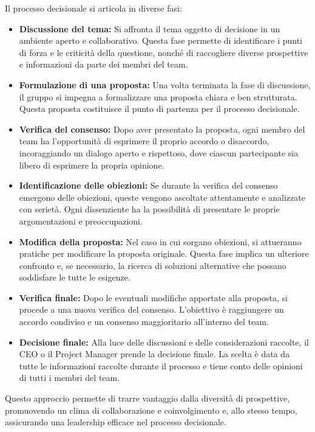 \documentclass[oneside]{book}
\begin{document}
Il processo decisionale si articola in diverse fasi:
\begin{itemize}
    \item \textbf{Discussione del tema:} Si affronta il tema oggetto di decisione in un ambiente aperto e collaborativo. Questa fase permette di identificare i punti di forza e le criticità della questione, nonché di raccogliere diverse prospettive e informazioni da parte dei membri del team.
    \item \textbf{Formulazione di una proposta:} Una volta terminata la fase di discussione, il gruppo si impegna a formalizzare una proposta chiara e ben strutturata. Questa proposta costituisce il punto di partenza per il processo decisionale.
    \item \textbf{Verifica del consenso:} Dopo aver presentato la proposta, ogni membro del team ha l'opportunità di esprimere il proprio accordo o disaccordo, incoraggiando un dialogo aperto e rispettoso, dove ciascun partecipante sia libero di esprimere la propria opinione.
    \item \textbf{Identificazione delle obiezioni:} Se durante la verifica del consenso emergono delle obiezioni, queste vengono ascoltate attentamente e analizzate con serietà. Ogni dissenziente ha la possibilità di presentare le proprie argomentazioni e preoccupazioni.
    \item \textbf{Modifica della proposta:} Nel caso in cui sorgano obiezioni, si attueranno pratiche per modificare la proposta originale. Questa fase implica un ulteriore confronto e, se necessario, la ricerca di soluzioni alternative che possano soddisfare le tutte le esigenze.
    \item \textbf{Verifica finale:} Dopo le eventuali modifiche apportate alla proposta, si procede a una nuova verifica del consenso. L'obiettivo è raggiungere un accordo condiviso e un consenso maggioritario all'interno del team.
    \item \textbf{Decisione finale:} Alla luce delle discussioni e delle considerazioni raccolte, il CEO o il Project Manager prende la decisione finale. La scelta è data da tutte le informazioni raccolte durante il processo e tiene conto delle opinioni di tutti i membri del team.
\end{itemize}

Questo approccio permette di trarre vantaggio dalla diversità di prospettive, promuovendo un clima di collaborazione e coinvolgimento e, allo stesso tempo, assicurando una leadership efficace nel processo decisionale.
\end{document}
